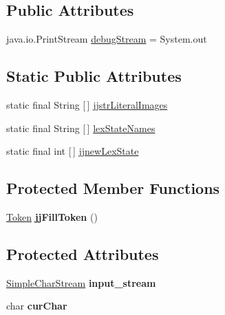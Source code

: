 \subsection*{Public Attributes}
\begin{DoxyCompactItemize}
\item 
java.\+io.\+Print\+Stream \mbox{\hyperlink{classanalizadores_1_1_gramatica_token_manager_a2ec8c23d9151cea8cd5b1af72785fcb3}{debug\+Stream}} = System.\+out
\end{DoxyCompactItemize}
\subsection*{Static Public Attributes}
\begin{DoxyCompactItemize}
\item 
static final String \mbox{[}$\,$\mbox{]} \mbox{\hyperlink{classanalizadores_1_1_gramatica_token_manager_ae1c9e207113b8eb7137f51e9f536da24}{jjstr\+Literal\+Images}}
\item 
static final String \mbox{[}$\,$\mbox{]} \mbox{\hyperlink{classanalizadores_1_1_gramatica_token_manager_ab71dac104a1e700d4a241947012f31f4}{lex\+State\+Names}}
\item 
static final int \mbox{[}$\,$\mbox{]} \mbox{\hyperlink{classanalizadores_1_1_gramatica_token_manager_a2baa7049af1afa94f630c069005226db}{jjnew\+Lex\+State}}
\end{DoxyCompactItemize}
\subsection*{Protected Member Functions}
\begin{DoxyCompactItemize}
\item 
\mbox{\label{classanalizadores_1_1_gramatica_token_manager_a66aa4d07660f6f1222bc56b2c95a5b07}} 
\mbox{\hyperlink{classanalizadores_1_1_token}{Token}} {\bfseries jj\+Fill\+Token} ()
\end{DoxyCompactItemize}
\subsection*{Protected Attributes}
\begin{DoxyCompactItemize}
\item 
\mbox{\label{classanalizadores_1_1_gramatica_token_manager_a599b2d374e33804e39ed44aeed378991}} 
\mbox{\hyperlink{classanalizadores_1_1_simple_char_stream}{Simple\+Char\+Stream}} {\bfseries input\+\_\+stream}
\item 
\mbox{\label{classanalizadores_1_1_gramatica_token_manager_a146b9520c114189d732e4c0891b511be}} 
char {\bfseries cur\+Char}
\end{DoxyCompactItemize}



